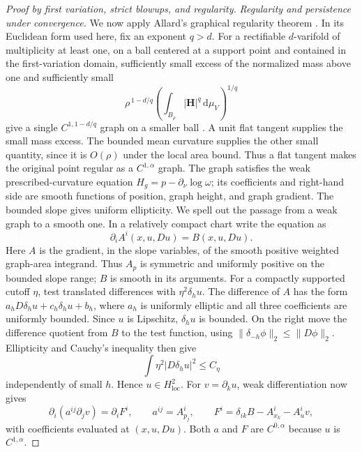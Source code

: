 \documentclass[11pt]{article}
\numberwithin{equation}{section}
\theoremstyle{definition}
\theoremstyle{remark}
\begin{document}
\begin{proof}[Proof by first variation, strict blowups, and regularity]
\emph{Regularity and persistence under convergence.}
We now apply Allard's graphical regularity theorem \citep{allard1972}.  In its Euclidean form used here,
fix an exponent $q>d$.  For a rectifiable $d$-varifold of multiplicity
at least one, on a ball centered at a support point and contained in
the first-variation domain, sufficiently small excess of the normalized
mass above one and sufficiently small
\[
       \rho^{\,1-d/q}
       \left(\int_{B_\rho}|\mathbf H|^q\,\mathrm d\mu_V\right)^{1/q}
\]
give a single $C^{1,1-d/q}$ graph on a smaller ball
\citep[Chapter~5, Theorem~5.2]{simonGMT}.  A unit flat tangent supplies
the small mass excess.  The bounded mean curvature supplies the other
small quantity, since it is $O(\rho)$ under the local area bound.
Thus a flat tangent makes the original point regular as a
$C^{1,\alpha}$ graph.  The graph satisfies the weak prescribed-curvature
equation
$H_g=p-\partial_\nu\log\omega$; its coefficients and right-hand side
are smooth functions of position, graph height, and graph gradient.
The bounded slope gives uniform ellipticity.  We spell out the passage
from a weak graph to a smooth one.  In a relatively compact chart write
the equation as
\[
 \partial_i A^i(x,u,Du)=B(x,u,Du).
\]
Here $A$ is the gradient, in the slope variables, of the smooth
positive weighted graph-area integrand.  Thus $A_p$ is symmetric and
uniformly positive on the bounded slope range; $B$ is smooth in its
arguments.  For a compactly supported cutoff $\eta$, test translated
differences with $\eta^2\delta_hu$.  The difference of $A$ has the form
$a_hD\delta_hu+c_h\delta_hu+b_h$, where $a_h$ is uniformly elliptic
and all three coefficients are uniformly bounded.  Since $u$ is
Lipschitz, $\delta_hu$ is bounded.  On the right move the difference
quotient from $B$ to the test function, using
$\|\delta_{-h}\phi\|_2\le\|D\phi\|_2$.
Ellipticity and Cauchy's inequality then give
\[
 \int\eta^2|D\delta_hu|^2\le C_\eta
\]
independently of small $h$.  Hence $u\in H^2_{\mathrm{loc}}$.
For $v=\partial_ku$, weak differentiation now gives
\[
 \partial_i(a^{ij}\partial_jv)=\partial_iF^i,\qquad
 a^{ij}=A^i_{p_j},\qquad
 F^i=\delta_{ik}B-A^i_{x_k}-A^i_uv,
\]
with coefficients evaluated at $(x,u,Du)$.  Both $a$ and $F$ are
$C^{0,\alpha}$ because $u$ is $C^{1,\alpha}$.


\end{proof}
\end{document}
